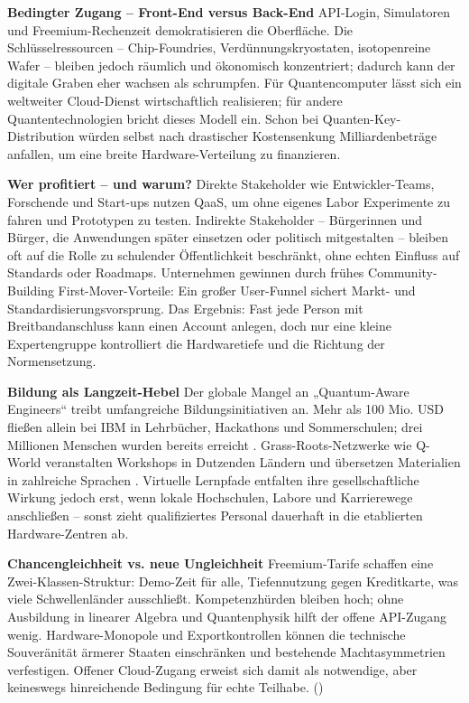 \textbf{Bedingter Zugang – Front-End versus Back-End}
API-Login, Simulatoren und Freemium-Rechenzeit demokratisieren die Oberfläche. Die Schlüsselressourcen – Chip-Foundries, Verdünnungskryostaten, isotopenreine Wafer – bleiben jedoch räumlich und ökonomisch konzentriert; dadurch kann der digitale Graben eher wachsen als schrumpfen.
Für Quantencomputer lässt sich ein weltweiter Cloud-Dienst wirtschaftlich realisieren; für andere Quantentechnologien bricht dieses Modell ein. Schon bei Quanten-Key-Distribution würden selbst nach drastischer Kostensenkung Milliardenbeträge anfallen, um eine breite Hardware-Verteilung zu finanzieren.\cite{seskirDemocratizationQuantumTechnologies2022}

\textbf{Wer profitiert – und warum?}
Direkte Stakeholder wie Entwickler-Teams, Forschende und Start-ups nutzen QaaS, um ohne eigenes Labor Experimente zu fahren und Prototypen zu testen.
Indirekte Stakeholder – Bürgerinnen und Bürger, die Anwendungen später einsetzen oder politisch mitgestalten – bleiben oft auf die Rolle zu schulender Öffentlichkeit beschränkt, ohne echten Einfluss auf Standards oder Roadmaps.
Unternehmen gewinnen durch frühes Community-Building First-Mover-Vorteile: Ein großer User-Funnel sichert Markt- und Standardisierungsvorsprung.
Das Ergebnis: Fast jede Person mit Breitbandanschluss kann einen Account anlegen, doch nur eine kleine Expertengruppe kontrolliert die Hardwaretiefe und die Richtung der Normensetzung.\cite{seskirDemocratizationQuantumTechnologies2022}

\textbf{Bildung als Langzeit-Hebel}
Der globale Mangel an „Quantum-Aware Engineers“ treibt umfangreiche Bildungsinitiativen an. Mehr als 100 Mio. USD fließen allein bei IBM in Lehrbücher, Hackathons und Sommerschulen; drei Millionen Menschen wurden bereits erreicht . Grass-Roots-Netzwerke wie Q-World veranstalten Workshops in Dutzenden Ländern und übersetzen Materialien in zahlreiche Sprachen .
Virtuelle Lernpfade entfalten ihre gesellschaftliche Wirkung jedoch erst, wenn lokale Hochschulen, Labore und Karrierewege anschließen – sonst zieht qualifiziertes Personal dauerhaft in die etablierten Hardware-Zentren ab.\cite{seskirDemocratizationQuantumTechnologies2022}

\textbf{Chancengleichheit vs. neue Ungleichheit}
Freemium-Tarife schaffen eine Zwei-Klassen-Struktur: Demo-Zeit für alle, Tiefennutzung gegen Kreditkarte, was viele Schwellenländer ausschließt.
Kompetenzhürden bleiben hoch; ohne Ausbildung in linearer Algebra und Quantenphysik hilft der offene API-Zugang wenig.
Hardware-Monopole und Exportkontrollen können die technische Souveränität ärmerer Staaten einschränken und bestehende Machtasymmetrien verfestigen.
Offener Cloud-Zugang erweist sich damit als notwendige, aber keineswegs hinreichende Bedingung für echte Teilhabe. (\cite{seskirDemocratizationQuantumTechnologies2022})

